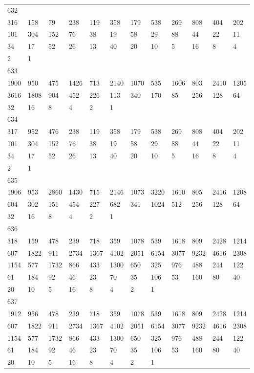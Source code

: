 \begin{longtable}{llllllllllll}
632&&&&&&&&&&&\\
316& 158& 79& 238& 119& 358& 179& 538& 269& 808& 404& 202\\
101& 304& 152& 76& 38& 19& 58& 29& 88& 44& 22& 11\\
34& 17& 52& 26& 13& 40& 20& 10& 5& 16& 8& 4\\
2& 1& \\

633&&&&&&&&&&&\\
1900& 950& 475& 1426& 713& 2140& 1070& 535& 1606& 803& 2410& 1205\\
3616& 1808& 904& 452& 226& 113& 340& 170& 85& 256& 128& 64\\
32& 16& 8& 4& 2& 1& \\

634&&&&&&&&&&&\\
317& 952& 476& 238& 119& 358& 179& 538& 269& 808& 404& 202\\
101& 304& 152& 76& 38& 19& 58& 29& 88& 44& 22& 11\\
34& 17& 52& 26& 13& 40& 20& 10& 5& 16& 8& 4\\
2& 1& \\

635&&&&&&&&&&&\\
1906& 953& 2860& 1430& 715& 2146& 1073& 3220& 1610& 805& 2416& 1208\\
604& 302& 151& 454& 227& 682& 341& 1024& 512& 256& 128& 64\\
32& 16& 8& 4& 2& 1& \\

636&&&&&&&&&&&\\
318& 159& 478& 239& 718& 359& 1078& 539& 1618& 809& 2428& 1214\\
607& 1822& 911& 2734& 1367& 4102& 2051& 6154& 3077& 9232& 4616& 2308\\
1154& 577& 1732& 866& 433& 1300& 650& 325& 976& 488& 244& 122\\
61& 184& 92& 46& 23& 70& 35& 106& 53& 160& 80& 40\\
20& 10& 5& 16& 8& 4& 2& 1& \\

637&&&&&&&&&&&\\
1912& 956& 478& 239& 718& 359& 1078& 539& 1618& 809& 2428& 1214\\
607& 1822& 911& 2734& 1367& 4102& 2051& 6154& 3077& 9232& 4616& 2308\\
1154& 577& 1732& 866& 433& 1300& 650& 325& 976& 488& 244& 122\\
61& 184& 92& 46& 23& 70& 35& 106& 53& 160& 80& 40\\
20& 10& 5& 16& 8& 4& 2& 1& \\


\end{longtable}
